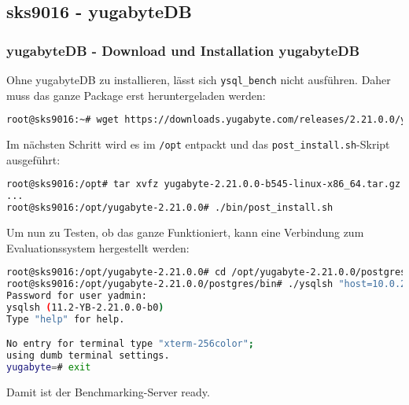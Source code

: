 
\begin{flushleft}
    \subsection{sks9016 - yugabyteDB}
    \subsubsection{yugabyteDB - Download und Installation yugabyteDB}
    Ohne yugabyteDB zu installieren, lässt sich \texttt{ysql\_bench} nicht ausführen.
    Daher muss das ganze Package erst heruntergeladen werden:
    \lstset{style=gra_codestyle}
    \begin{lstlisting}[language=bash, caption=sks9016 - Download yugabyteDB On-Premise,captionpos=b,label={lst:sks9016-yugabytedb-download-on-premise},breaklines=true]
root@sks9016:~# wget https://downloads.yugabyte.com/releases/2.21.0.0/yugabyte-2.21.0.0-b545-linux-x86_64.tar.gz
    \end{lstlisting}
\end{flushleft}
\begin{flushleft}
    Im nächsten Schritt wird es im \texttt{/opt} entpackt und das \texttt{post\_install.sh}-Skript ausgeführt:
    \lstset{style=gra_codestyle}
    \begin{lstlisting}[language=bash, caption=sks9016 - Installation yugabyteDB On-Premise,captionpos=b,label={lst:sks9016-yugabytedb-install-on-premise},breaklines=true]
root@sks9016:/opt# tar xvfz yugabyte-2.21.0.0-b545-linux-x86_64.tar.gz && cd yugabyte-2.21.0.0/
...
root@sks9016:/opt/yugabyte-2.21.0.0# ./bin/post_install.sh
    \end{lstlisting}
\end{flushleft}
\begin{flushleft}
    Um nun zu Testen, ob das ganze Funktioniert, kann eine Verbindung zum Evaluationssystem hergestellt werden:
    \lstset{style=gra_codestyle}
    \begin{lstlisting}[language=bash, caption=sks9016 - Check yugabyteDB On-Premise,captionpos=b,label={lst:sks9016-yugabytedb-check-on-premise},breaklines=true]
root@sks9016:/opt/yugabyte-2.21.0.0# cd /opt/yugabyte-2.21.0.0/postgres/bin/
root@sks9016:/opt/yugabyte-2.21.0.0/postgres/bin# ./ysqlsh "host=10.0.20.106 user=yadmin"
Password for user yadmin:
ysqlsh (11.2-YB-2.21.0.0-b0)
Type "help" for help.

No entry for terminal type "xterm-256color";
using dumb terminal settings.
yugabyte=# exit
    \end{lstlisting}
    Damit ist der Benchmarking-Server ready.
\end{flushleft}